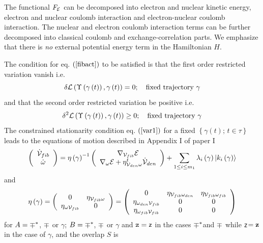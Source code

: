 The functional $F_{{\cal E}}$ can be decomposed into electron and nuclear
kinetic energy, electron and nuclear coulomb interaction and
electron-nuclear coulomb interaction. The nuclear and electron coulomb
interaction terms can be further decomposed into classical coulomb and
exchange-correlation parts. We emphasize that there is {\em no }external
potential energy term in the Hamiltonian $H$.

The condition for eq. $\left( \ref{fibact}\right) $ to be satisfied is that
the first order restricted variation vanish i.e. 
\begin{equation}
\delta {\cal L}\left( \Upsilon \left( \gamma \left( t\right) \right) ,\gamma
\left( t\right) \right) =0;\quad \text{fixed trajectory }\gamma  \label{var1}
\end{equation}%
and that the second order restricted variation be positive i.e. 
\begin{equation}
\delta ^{2}{\cal L}\left( \Upsilon \left( \gamma \left( t\right) \right)
,\gamma \left( t\right) \right) \geq 0;\quad \text{fixed trajectory }\gamma
\end{equation}%
The constrained stationarity condition eq. $\left( \ref{var1}\right) $ for a
fixed $\left\{ \gamma \left( t\right) ;\,t\in \tau \right\} $ leads to the
equations of motion described in Appendix I of paper I 
\begin{equation}
\left( 
\begin{array}{c}
{\cal \dot{V}}_{fib} \\ 
\dot{\omega}%
\end{array}%
\right) =\eta \left( {\cal \gamma }\right) ^{-1}\left( 
\begin{array}{c}
\nabla _{{\cal V}_{fib}}{\cal E} \\ 
\nabla _{\omega }{\cal E}+\eta _{{\cal V}_{den}\omega }^{t}{\cal \dot{V}}%
_{den}%
\end{array}%
\right) +\sum_{1\leq i\leq m_{1}}\lambda _{i}\left( {\cal \gamma }\right)
\left| k_{i}\left( {\cal \gamma }\right) \right\rangle  \label{EOM}
\end{equation}
and 
\begin{equation}
\eta \left( {\cal \gamma }\right) =\left( 
\begin{array}{cc}
0 & \eta _{{\cal V}_{fib}\omega } \\ 
\eta _{\omega {\cal V}_{fib}} & 0%
\end{array}%
\right) =\left( 
\begin{array}{ccc}
0 & \eta _{{\cal V}_{fib}\omega _{den}} & \eta _{{\cal V}_{fib}\omega _{fib}}
\\ 
\eta _{\omega _{den}{\cal V}_{fib}} & 0 & 0 \\ 
\eta _{\omega _{fib}{\cal V}_{fib}} & 0 & 0%
\end{array}%
\right)  \label{etamat}
\end{equation}%
for $A={\cal \Upsilon }^{\ast }$, ${\cal \Upsilon }$ or $\gamma $; $B={\cal %
\Upsilon }^{\ast }$, ${\cal \Upsilon }$ or $\gamma $ and ${\tt z}={\sf z}$
in the cases ${\cal \Upsilon }^{\ast }$and ${\cal \Upsilon }$ while {\tt z}$=%
{\bf z}$ in the case of $\gamma $, and the overlap $S$ is

